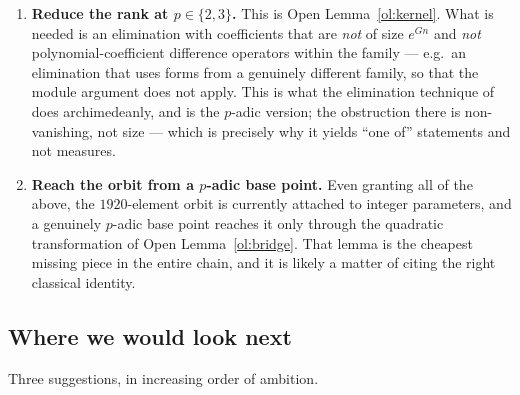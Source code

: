 \begin{enumerate}[label=\textup{(\Alph*)},leftmargin=2.8em,itemsep=5pt]
\item \textbf{Reduce the rank at $p\in\{2,3\}$.} This is Open Lemma~\ref{ol:kernel}. What is
      needed is an elimination with coefficients that are \emph{not} of size $e^{Gn}$ and
      \emph{not} polynomial-coefficient difference operators within the family --- e.g.\ an
      elimination that uses forms from a genuinely different family, so that the module
      argument does not apply. This is what the elimination technique of \cite{FSZ2019} does
      archimedeanly, and \cite{LaiSprang2023} is the $p$-adic version; the obstruction there
      is non-vanishing, not size --- which is precisely why it yields ``one of'' statements
      and not measures.

\item \textbf{Reach the orbit from a $p$-adic base point.} Even granting all of the above,
      the $1920$-element orbit is currently attached to integer parameters, and a genuinely
      $p$-adic base point reaches it only through the quadratic transformation of Open
      Lemma~\ref{ol:bridge}. That lemma is the cheapest missing piece in the entire chain,
      and it is likely a matter of citing the right classical identity.
\end{enumerate}

\subsection{Where we would look next}\label{ss:next}

Three suggestions, in increasing order of ambition.

